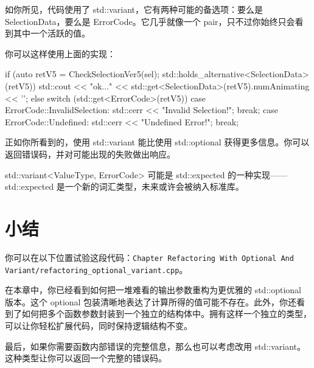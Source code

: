 如你所见，代码使用了 std::variant，它有两种可能的备选项：要么是 SelectionData，要么是 ErrorCode。它几乎就像一个 pair，只不过你始终只会看到其中一个活跃的值。

你可以这样使用上面的实现：

\begin{codebox}[cpp]
if (auto retV5 = CheckSelectionVer5(sel);
    std::holds_alternative<SelectionData>(retV5))
{
    std::cout << "ok..."
              << std::get<SelectionData>(retV5).numAnimating << '\n';
}
else
{
    switch (std::get<ErrorCode>(retV5))
    {
    case ErrorCode::InvalidSelection:
        std::cerr << "Invalid Selection!\n";
        break;
    case ErrorCode::Undefined:
        std::cerr << "Undefined Error!\n";
        break;
    }
}
\end{codebox}

正如你所看到的，使用 std::variant 能比使用 std::optional 获得更多信息。你可以返回错误码，并对可能出现的失败做出响应。

std::variant<ValueType, ErrorCode> 可能是 std::expected 的一种实现——std::expected 是一个新的词汇类型，未来或许会被纳入标准库。

\section{小结}

你可以在以下位置试验这段代码：\texttt{Chapter Refactoring With Optional And Variant/refactoring\_optional\_variant.cpp}。

在本章中，你已经看到如何把一堆难看的输出参数重构为更优雅的 std::optional 版本。这个 optional 包装清晰地表达了计算所得的值可能不存在。此外，你还看到了如何把多个函数参数封装到一个独立的结构体中。拥有这样一个独立的类型，可以让你轻松扩展代码，同时保持逻辑结构不变。

最后，如果你需要函数内部错误的完整信息，那么也可以考虑改用 std::variant。这种类型让你可以返回一个完整的错误码。
